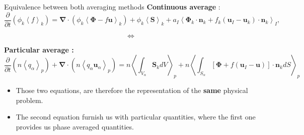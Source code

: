 \documentclass{sintefbeamer}
\newcommand{\kavg}[1]{\left<#1\right>_k}
\newcommand{\Iavg}[1]{\left<#1\right>_I}
\newcommand{\pavg}[1]{n \left<#1\right>_p}
\newcommand{\nablab}{\bm{\nabla}}
\newcommand{\pddt}{\frac{\partial}{\partial t}}
\begin{document}
\begin{frame}{Equivalence between both averaging methods}
  \textbf{Continuous average} :
  \begin{equation*}
      \pddt (\phi_k\kavg{f})
      = \nablab \cdot \left(
          \phi_k \kavg{\bm{\Phi} - f \textbf{u}}
      \right)
      + \phi_k \kavg{\textbf{S}}
      + a_I \Iavg{
          \bm{\Phi}_k \cdot \textbf{n}_k
          + f_k 
          \left(
              \textbf{u}_I
              - \textbf{u}_k
          \right) \cdot \textbf{n}_k
      },
      \label{eq:avg_k_global}
  \end{equation*}

  \begin{center}
    \begin{equation*}
      \Longleftrightarrow 
    \end{equation*}
  \end{center}
  \textbf{Particular average :}
  \begin{equation*}
    \pddt   \left(\pavg{q_\alpha}\right)
    + \nablab \cdot \left(\pavg{q_\alpha \textbf{u}_\alpha}\right) 
    = \pavg{\int_{V_\alpha} \textbf{S}_k dV}
    + \pavg{\int_{S_\alpha} \left[\bm{\Phi} + f (\textbf{u}_I-\textbf{u}) \right] \cdot \textbf{n}_k d S}
    \label{eq:avg_p_global}
\end{equation*}
\begin{itemize}
  \item Those two equations, are therefore the representation of the \textbf{same} physical problem.
  \item The second equation furnish us with particular quantities, where the first one provides us phase averaged quantities. 
\end{itemize}
\end{frame}

\backmatter
\end{document}
